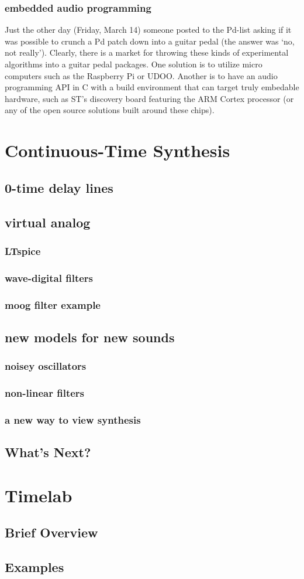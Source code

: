 \documentclass{article}
\begin{document}
\subsubsection{embedded audio programming}
Just the other day (Friday, March 14) someone posted to the Pd-list asking if it was possible to crunch a Pd patch down into a guitar pedal (the answer was `no, not really'). Clearly, there is a market for throwing these kinds of experimental algorithms into a guitar pedal packages. One solution is to utilize micro computers such as the Raspberry Pi or UDOO. Another is to have an audio programming API in C with a build environment that can target truly embedable hardware, such as ST's discovery board featuring the ARM Cortex processor (or any of the open source solutions built around these chips).

\section{Continuous-Time Synthesis}
\subsection{0-time delay lines}
\subsection{virtual analog}
\subsubsection{LTspice}
\subsubsection{wave-digital filters}
\subsubsection{moog filter example}

\subsection{new models for new sounds}
\subsubsection{noisey oscillators}
\subsubsection{non-linear filters}
\subsubsection{a new way to view synthesis}

\subsection{What's Next?}
\section{Timelab}
\subsection{Brief Overview}
\subsection{Examples}
\end{document}

